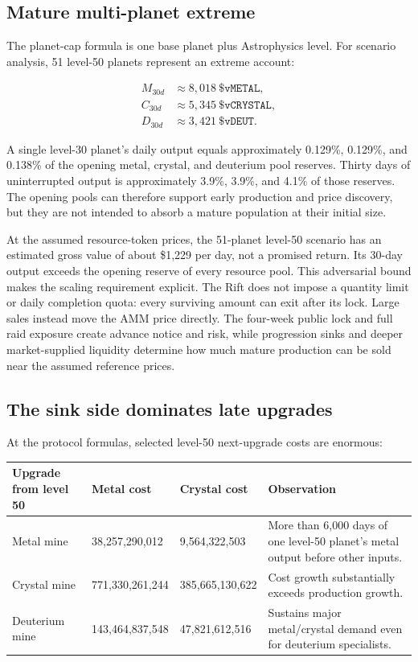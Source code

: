 \documentclass[11pt]{article}
\newcommand{\token}[1]{\texttt{\$#1}}
\begin{document}
\subsection{Mature multi-planet extreme}

The planet-cap formula is one base planet plus Astrophysics level. For scenario analysis, 51 level-50 planets represent an extreme account:

\begin{align}
M_{30d} &\approx 8{,}018\ \token{vMETAL},\\
C_{30d} &\approx 5{,}345\ \token{vCRYSTAL},\\
D_{30d} &\approx 3{,}421\ \token{vDEUT}.
\end{align}

A single level-30 planet's daily output equals approximately 0.129\%, 0.129\%, and 0.138\% of the opening metal, crystal, and deuterium pool reserves. Thirty days of uninterrupted output is approximately 3.9\%, 3.9\%, and 4.1\% of those reserves. The opening pools can therefore support early production and price discovery, but they are not intended to absorb a mature population at their initial size.

At the assumed resource-token prices, the 51-planet level-50 scenario has an estimated gross value of about \$1,229 per day, not a promised return. Its 30-day output exceeds the opening reserve of every resource pool. This adversarial bound makes the scaling requirement explicit. The Rift does not impose a quantity limit or daily completion quota: every surviving amount can exit after its lock. Large sales instead move the AMM price directly. The four-week public lock and full raid exposure create advance notice and risk, while progression sinks and deeper market-supplied liquidity determine how much mature production can be sold near the assumed reference prices.

\subsection{The sink side dominates late upgrades}

At the protocol formulas, selected level-50 next-upgrade costs are enormous:

\begin{table}[H]
\centering
\scriptsize
\begin{tabularx}{\textwidth}{@{}p{} p{} p{} X@{}}
\toprule
\textbf{Upgrade from level 50} & \textbf{Metal cost} & \textbf{Crystal cost} & \textbf{Observation} \\
\midrule
Metal mine & 38,257,290,012 & 9,564,322,503 & More than 6,000 days of one level-50 planet's metal output before other inputs. \\
Crystal mine & 771,330,261,244 & 385,665,130,622 & Cost growth substantially exceeds production growth. \\
Deuterium mine & 143,464,837,548 & 47,821,612,516 & Sustains major metal/crystal demand even for deuterium specialists. \\
\bottomrule
\end{tabularx}
\end{table}
\end{document}
